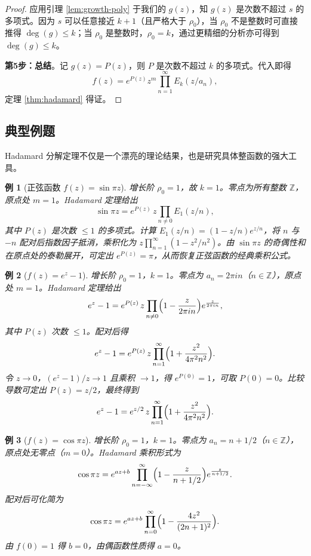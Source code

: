 \documentclass[UTF8]{ctexart}
\newtheorem{example}{例}[section]
\numberwithin{equation}{section}
\begin{document}
\begin{proof}
应用引理 \ref{lem:growth-poly} 于我们的 \(g(z)\)，知 \(g(z)\) 是次数不超过 \(s\) 的多项式。因为 \(s\) 可以任意接近 \(k+1\)（且严格大于 \(\rho_0\)），当 \(\rho_0\) 不是整数时可直接推得 \(\deg(g) \le k\)；当 \(\rho_0\) 是整数时，\(\rho_0 = k\)，通过更精细的分析亦可得到 \(\deg(g) \le k\)。

\textbf{第5步：总结}。记 \(g(z) = P(z)\)，则 \(P\) 是次数不超过 \(k\) 的多项式。代入即得
\[
f(z) = e^{P(z)} z^m \prod_{n=1}^\infty E_k(z/a_n),
\]
定理 \ref{thm:hadamard} 得证。
\end{proof}

\subsection{典型例题}

Hadamard 分解定理不仅是一个漂亮的理论结果，也是研究具体整函数的强大工具。

\begin{example}[正弦函数 \(f(z) = \sin \pi z\)]
增长阶 \(\rho_0 = 1\)，故 \(k = 1\)。零点为所有整数 \(\mathbb{Z}\)，原点处 \(m=1\)。Hadamard 定理给出
\[
\sin \pi z = e^{P(z)} \, z \prod_{n \neq 0} E_1(z/n),
\]
其中 \(P(z)\) 是次数 \(\le 1\) 的多项式。计算 \(E_1(z/n) = (1 - z/n) e^{z/n}\)，将 \(n\) 与 \(-n\) 配对后指数因子抵消，乘积化为 \(z \prod_{n=1}^\infty (1 - z^2/n^2)\)。由 \(\sin \pi z\) 的奇偶性和在原点处的泰勒展开，可定出 \(e^{P(z)} = \pi\)，从而恢复正弦函数的经典乘积公式。
\end{example}

\begin{example}[\(f(z) = e^z - 1\)]
增长阶 \(\rho_0 = 1\)，\(k = 1\)。零点为 \(a_n = 2\pi i n\)（\(n \in \mathbb{Z}\)），原点处 \(m=1\)。Hadamard 定理给出
\[
e^z - 1 = e^{P(z)} \, z \prod_{n \neq 0} \Bigl(1 - \frac{z}{2\pi i n}\Bigr) e^{\frac{z}{2\pi i n}},
\]
其中 \(P(z)\) 次数 \(\le 1\)。配对后得
\[
e^z - 1 = e^{P(z)} \, z \prod_{n=1}^\infty \Bigl(1 + \frac{z^2}{4\pi^2 n^2}\Bigr).
\]
令 \(z \to 0\)，\((e^z - 1)/z \to 1\) 且乘积 \(\to 1\)，得 \(e^{P(0)} = 1\)，可取 \(P(0)=0\)。比较导数可定出 \(P(z) = z/2\)，最终得到
\[
e^z - 1 = e^{z/2} \, z \prod_{n=1}^\infty \Bigl(1 + \frac{z^2}{4\pi^2 n^2}\Bigr).
\]
\end{example}

\begin{example}[\(f(z) = \cos \pi z\)]
增长阶 \(\rho_0 = 1\)，\(k = 1\)。零点为 \(a_n = n + 1/2\)（\(n \in \mathbb{Z}\)），原点处无零点（\(m=0\)）。Hadamard 乘积形式为
\[
\cos \pi z = e^{a z + b} \prod_{n=-\infty}^\infty \Bigl(1 - \frac{z}{n+1/2}\Bigr) e^{\frac{z}{n+1/2}}.
\]
配对后可化简为
\[
\cos \pi z = e^{a z + b} \prod_{n=0}^\infty \Bigl(1 - \frac{4z^2}{(2n+1)^2}\Bigr).
\]
由 \(f(0)=1\) 得 \(b=0\)，由偶函数性质得 \(a=0\)。
\end{example}
\end{document}
